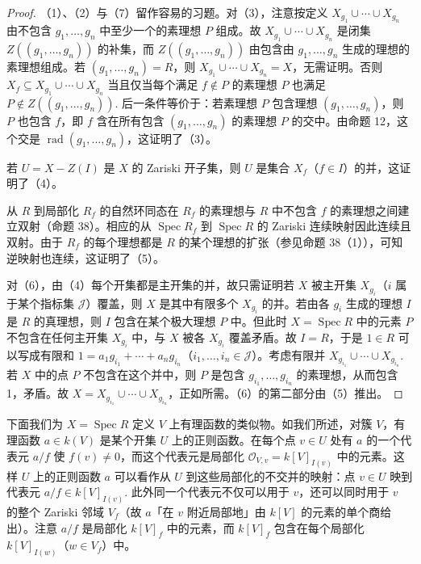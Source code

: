 \begin{proof}
（1）、（2）与（7）留作容易的习题。对（3），注意按定义 \(X_{g_1} \cup \cdots \cup X_{g_n}\) 由不包含 \(g_1, \ldots, g_n\) 中至少一个的素理想 \(P\) 组成。故 \(X_{g_1} \cup \cdots \cup X_{g_n}\) 是闭集 \(Z((g_1, \ldots, g_n))\) 的补集，而 \(Z((g_1,\ldots,g_n))\) 由包含由 \(g_1, \ldots, g_n\) 生成的理想的素理想组成。若 \((g_1, \ldots, g_n) = R\)，则 \(X_{g_1} \cup \cdots \cup X_{g_n} = X\)，无需证明。否则 \(X_f \subseteq X_{g_1} \cup \cdots \cup X_{g_n}\) 当且仅当每个满足 \(f \notin P\) 的素理想 \(P\) 也满足 \(P \notin Z((g_1,\ldots,g_n))\). 后一条件等价于：若素理想 \(P\) 包含理想 \((g_1,\ldots,g_n)\)，则 \(P\) 也包含 \(f\)，即 \(f\) 含在所有包含 \((g_1,\ldots,g_n)\) 的素理想 \(P\) 的交中。由命题 12，这个交是 \(\operatorname{rad}(g_1,\ldots,g_n)\)，这证明了（3）。

若 \(U = X-Z(I)\) 是 \(X\) 的 Zariski 开子集，则 \(U\) 是集合 \(X_f\)（\(f \in I\)）的并，这证明了（4）。

从 \(R\) 到局部化 \(R_f\) 的自然环同态在 \(R_f\) 的素理想与 \(R\) 中不包含 \(f\) 的素理想之间建立双射（命题 38）。相应的从 \(\operatorname{Spec}R_f\) 到 \(\operatorname{Spec}R\) 的 Zariski 连续映射因此连续且双射。由于 \(R_f\) 的每个理想都是 \(R\) 的某个理想的扩张（参见命题 38（1）），可知逆映射也连续，这证明了（5）。

对（6），由（4）每个开集都是主开集的并，故只需证明若 \(X\) 被主开集 \(X_{g_i}\)（\(i\) 属于某个指标集 \(\mathcal{J}\)）覆盖，则 \(X\) 是其中有限多个 \(X_{g_i}\) 的并。若由各 \(g_i\) 生成的理想 \(I\) 是 \(R\) 的真理想，则 \(I\) 包含在某个极大理想 \(P\) 中。但此时 \(X = \operatorname{Spec}R\) 中的元素 \(P\) 不包含在任何主开集 \(X_{g_i}\) 中，与 \(X\) 被各 \(X_{g_i}\) 覆盖矛盾。故 \(I = R\)，于是 \(1 \in R\) 可以写成有限和 \(1 = a_1g_{i_1}+\cdots+a_ng_{i_n}\)（\(i_1, \ldots, i_n \in \mathcal{J}\)）。考虑有限并 \(X_{g_{i_1}} \cup \cdots \cup X_{g_{i_n}}\). 若 \(X\) 中的点 \(P\) 不包含在这个并中，则 \(P\) 是包含 \(g_{i_1}, \ldots, g_{i_n}\) 的素理想，从而包含 1，矛盾。故 \(X = X_{g_{i_1}} \cup \cdots \cup X_{g_{i_n}}\)，正如所需。（6）的第二部分由（5）推出。
\end{proof}

下面我们为 \(X = \operatorname{Spec}R\) 定义 \(V\) 上有理函数的类似物。如我们所述，对簇 \(V\)，有理函数 \(a \in k(V)\) 是某个开集 \(U\) 上的正则函数。在每个点 \(v \in U\) 处有 \(a\) 的一个代表元 \(a/f\) 使 \(f(v) \neq 0\)，而这个代表元是局部化 \(\mathcal{O}_{V,v} = k[V]_{I(v)}\) 中的元素。这样 \(U\) 上的正则函数 \(a\) 可以看作从 \(U\) 到这些局部化的不交并的映射：点 \(v \in U\) 映到代表元 \(a/f \in k[V]_{I(v)}\). 此外同一个代表元不仅可以用于 \(v\)，还可以同时用于 \(v\) 的整个 Zariski 邻域 \(V_f\)（故 \(a\)「在 \(v\) 附近局部地」由 \(k[V]\) 的元素的单个商给出）。注意 \(a/f\) 是局部化 \(k[V]_f\) 中的元素，而 \(k[V]_f\) 包含在每个局部化 \(k[V]_{I(w)}\)（\(w \in V_f\)）中。


